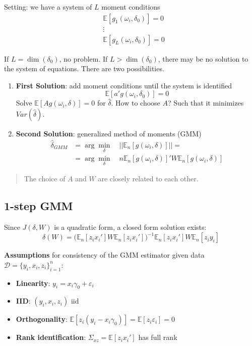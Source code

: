 \documentclass[12pt,]{book}
\providecommand{\tightlist}{%
  \setlength{\itemsep}{0pt}\setlength{\parskip}{0pt}}
\begin{document}
Setting: we have a system of \(L\) moment conditions
\[
\begin{aligned}
    & \mathbb E[g_1(\omega_i, \delta_0)] = 0 \\
    & \vdots \\
    & \mathbb E[g_L(\omega_i, \delta_0)] = 0
\end{aligned}
\]

If \(L = \dim (\delta_0)\), no problem. If \(L > \dim (\delta_0)\), there may be no solution to the system of equations. There are two possibilities.

\begin{enumerate}
\def\labelenumi{\arabic{enumi}.}
\tightlist
\item
  \textbf{First Solution}: add moment conditions until the system is identified
  \[
     \mathbb E[ a' g(\omega_i, \delta_0)] = 0
   \]
  Solve \(\mathbb E[Ag(\omega_i, \delta)] = 0\) for \(\hat{\delta}\). How to choose \(A\)? Such that it minimizes \(Var(\hat{\delta})\).\\
\item
  \textbf{Second Solution}: generalized method of moments (GMM)
  \[
   \begin{aligned}
     \hat{\delta} _ {GMM} &= \arg \min _ \delta \quad  \Big| \Big| \mathbb E_n [ g(\omega_i, \delta) ] \Big| \Big| = \\
     &= \arg \min _ \delta \quad n \mathbb E_n[g(\omega_i, \delta)]' W \mathbb E_n [g(\omega_i, \delta)]
   \end{aligned}
   \]
\end{enumerate}

\begin{quote}
The choice of \(A\) and \(W\) are closely related to each other.
\end{quote}

\hypertarget{step-gmm}{%
\subsection{1-step GMM}\label{step-gmm}}

Since \(J(\delta,W)\) is a quadratic form, a closed form solution exists:
\[
    \hat{\delta}(W) = \Big(\mathbb E_n[z_i x_i'] W \mathbb E_n[z_i x_i'] \Big)^{-1}\mathbb E_n[z_i x_i'] W \mathbb E_n[z_i y_i]
\]

\textbf{Assumptions} for consistency of the GMM estimator given data \(\mathcal D = \{y_i, x_i, z_i \} _ {i=1}^n\):

\begin{itemize}
\tightlist
\item
  \textbf{Linearity}: \(y_i = x_i\gamma_0 + \varepsilon_i\)
\item
  \textbf{IID}: \((y_i, x_i, z_i)\) iid
\item
  \textbf{Orthogonality}: \(\mathbb E [z_i(y_i - x_i\gamma_0)] = \mathbb E[z_i \varepsilon_i] = 0\)
\item
  \textbf{Rank identification}: \(\Sigma_{xz} = \mathbb E[z_i x_i']\) has full rank
\end{itemize}
\end{document}
